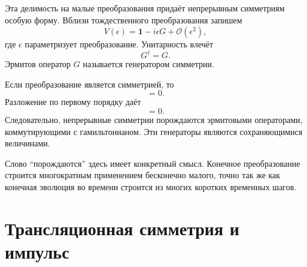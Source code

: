 Эта делимость на малые преобразования придаёт непрерывным симметриям особую форму. Вблизи тождественного преобразования запишем
\begin{equation}
V(\epsilon)
=
\mathbf 1-i\epsilon G+\mathcal O(\epsilon^2),
\end{equation}
где \(\epsilon\) параметризует преобразование. Унитарность влечёт
\begin{equation}
G^\dagger=G.
\end{equation}
Эрмитов оператор \(G\) называется генератором симметрии.

Если преобразование является симметрией, то
\begin{equation}
[H,V(\epsilon)]=0.
\end{equation}
Разложение по первому порядку даёт
\begin{equation}
[H,G]=0.
\end{equation}
Следовательно, непрерывные симметрии порождаются эрмитовыми операторами, коммутирующими с гамильтонианом. Эти генераторы являются сохраняющимися величинами.

Слово ``порождаются'' здесь имеет конкретный смысл. Конечное преобразование строится многократным применением бесконечно малого, точно так же как конечная эволюция во времени строится из многих коротких временных шагов.

\section{Трансляционная симметрия и импульс}

